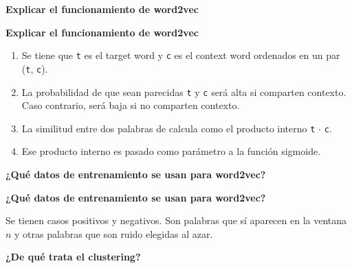 \documentclass[10pt]{memoir}
\begin{document}
\clearpage
\begin{center}
	\textbf{\Large Explicar el funcionamiento de word2vec} \\
\end{center}

\clearpage
\begin{center}
	\textbf{\Large Explicar el funcionamiento de word2vec} \\
\end{center}
\begin{enumerate}
	\item Se tiene que \texttt{t} es el target word y \texttt{c} es el context word ordenados en un par (\texttt{t}, \texttt{c}).
	\item La probabilidad de que sean parecidas \texttt{t} y \texttt{c} será alta si comparten contexto. Caso contrario, será baja si no comparten contexto.
	\item La similitud entre dos palabras de calcula como el producto interno \texttt{t} $\cdot$ \texttt{c}.
	\item Ese producto interno es pasado como parámetro a la función sigmoide.
\end{enumerate}

\clearpage
\begin{center}
	\textbf{\Large ¿Qué datos de entrenamiento se usan para word2vec?} \\
\end{center}

\clearpage
\begin{center}
	\textbf{\Large ¿Qué datos de entrenamiento se usan para word2vec?} \\
\end{center}
\noindent Se tienen casos positivos y negativos. Son palabras que sí aparecen en la ventana $n$ y otras palabras que son ruido elegidas al azar.


\clearpage
\begin{center}
	\textbf{\Large ¿De qué trata el clustering?} \\
\end{center}
\end{document}
